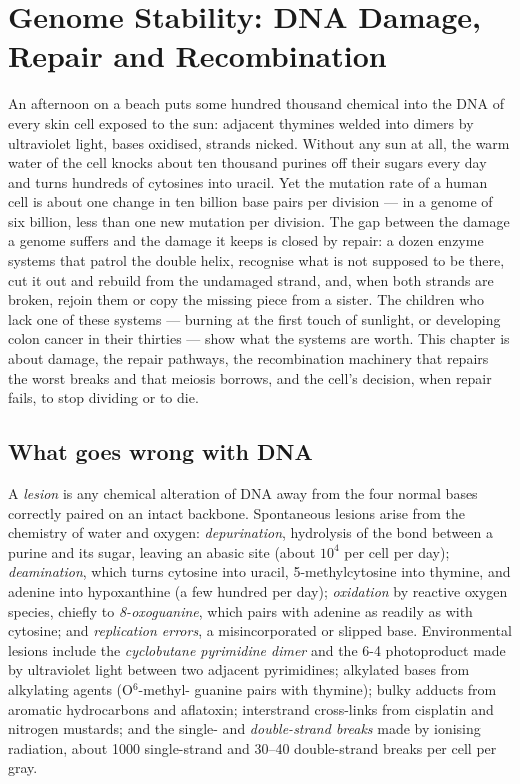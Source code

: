 \chapter{Genome Stability: DNA Damage, Repair and Recombination}\label{ch:b3:dna-repair}

An afternoon on a beach puts some hundred thousand chemical 
into the DNA of every skin cell exposed to the sun: adjacent
thymines welded into dimers by ultraviolet light, bases oxidised,
strands nicked. Without any sun at all, the warm water of the cell
knocks about ten thousand purines off their sugars every day and
turns hundreds of cytosines into uracil. Yet the mutation rate of a
human cell is about one change in ten billion base pairs per division
--- in a genome of six billion, less than one new mutation per
division. The gap between the damage a genome suffers and the damage
it keeps is closed by repair: a dozen enzyme systems that patrol the
double helix, recognise what is not supposed to be there, cut it out
and rebuild from the undamaged strand, and, when both strands are
broken, rejoin them or copy the missing piece from a sister. The
children who lack one of these systems --- burning at the first touch
of sunlight, or developing colon cancer in their thirties --- show
what the systems are worth. This chapter is about damage, the repair
pathways, the recombination machinery that repairs the worst breaks
and that meiosis borrows, and the cell's decision, when repair fails,
to stop dividing or to die.

\section{What goes wrong with DNA}

\begin{definition}\label{def:b3:dna-repair:lesions}
A \emph{lesion} is any chemical alteration of DNA away from the four
normal bases correctly paired on an intact backbone. Spontaneous
lesions arise from the chemistry of water and oxygen: \emph{depurination},
hydrolysis of the bond between a purine and its sugar, leaving an
abasic site (about $10^{4}$ per cell per day); \emph{deamination},
which turns cytosine into uracil, 5-methylcytosine into thymine, and
adenine into hypoxanthine (a few hundred per day); \emph{oxidation}
by reactive oxygen species, chiefly to \emph{8-oxoguanine}, which
pairs with adenine as readily as with cytosine; and \emph{replication
errors}, a misincorporated or slipped base. Environmental lesions
include the \emph{cyclobutane pyrimidine dimer} and the 6-4
photoproduct made by ultraviolet light between two adjacent
pyrimidines; alkylated bases from alkylating agents (O$^{6}$-methyl-
guanine pairs with thymine); bulky adducts from aromatic
hydrocarbons and aflatoxin; interstrand cross-links from cisplatin
and nitrogen mustards; and the single- and \emph{double-strand breaks}
made by ionising radiation, about \num{1000} single-strand and
\numrange{30}{40} double-strand breaks per cell per gray.
\end{definition}

